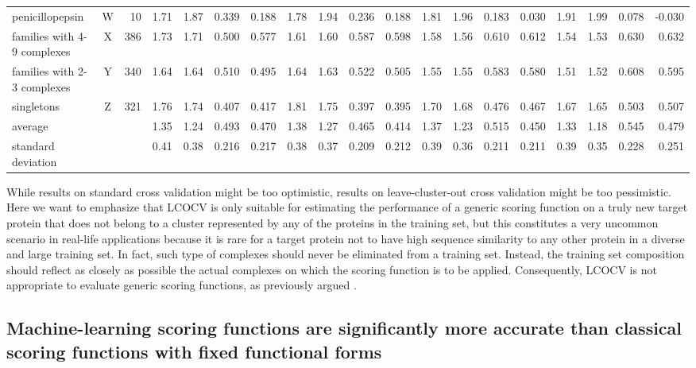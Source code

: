\begin{table}
\begin{tabular}{lcrrrrrrrrrrrrrrrrr}
penicillopepsin                & W &  10 & 1.71 & 1.87 & 0.339 & 0.188 & 1.78 & 1.94 & 0.236 & 0.188 & 1.81 & 1.96 & 0.183 & 0.030 & 1.91 & 1.99 & 0.078 &-0.030\\
families with 4-9 complexes    & X & 386 & 1.73 & 1.71 & 0.500 & 0.577 & 1.61 & 1.60 & 0.587 & 0.598 & 1.58 & 1.56 & 0.610 & 0.612 & 1.54 & 1.53 & 0.630 & 0.632\\
families with 2-3 complexes    & Y & 340 & 1.64 & 1.64 & 0.510 & 0.495 & 1.64 & 1.63 & 0.522 & 0.505 & 1.55 & 1.55 & 0.583 & 0.580 & 1.51 & 1.52 & 0.608 & 0.595\\
singletons                     & Z & 321 & 1.76 & 1.74 & 0.407 & 0.417 & 1.81 & 1.75 & 0.397 & 0.395 & 1.70 & 1.68 & 0.476 & 0.467 & 1.67 & 1.65 & 0.503 & 0.507\\
average                        &   &     & 1.35 & 1.24 & 0.493 & 0.470 & 1.38 & 1.27 & 0.465 & 0.414 & 1.37 & 1.23 & 0.515 & 0.450 & 1.33 & 1.18 & 0.545 & 0.479\\
standard deviation             &   &     & 0.41 & 0.38 & 0.216 & 0.217 & 0.38 & 0.37 & 0.209 & 0.212 & 0.39 & 0.36 & 0.211 & 0.211 & 0.39 & 0.35 & 0.228 & 0.251\\
\hline
\end{tabular}
\end{table}

While results on standard cross validation might be too optimistic, results on leave-cluster-out cross validation might be too pessimistic. Here we want to emphasize that LCOCV is only suitable for estimating the performance of a generic scoring function on a truly new target protein that does not belong to a cluster represented by any of the proteins in the training set, but this constitutes a very uncommon scenario in real-life applications because it is rare for a target protein not to have high sequence similarity to any other protein in a diverse and large training set. In fact, such type of complexes should never be eliminated from a training set. Instead, the training set composition should reflect as closely as possible the actual complexes on which the scoring function is to be applied. Consequently, LCOCV is not appropriate to evaluate generic scoring functions, as previously argued \citep{908}.

\subsection{Machine-learning scoring functions are significantly more accurate than classical scoring functions with fixed functional forms}

